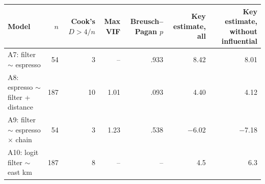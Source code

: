 \begin{tabular}{lrrrrrr}
\toprule
Model & $n$ & Cook's $D > 4/n$ & Max VIF & Breusch--Pagan $p$ & Key estimate, all & Key estimate, without influential \\
\midrule
A7: filter $\sim$ espresso &  54 &  3 & -- & .933 & 8.42 & 8.01 \\
A8: espresso $\sim$ filter + distance & 187 & 10 & 1.01 & .093 & 4.40 & 4.12 \\
A9: filter $\sim$ espresso $\times$ chain &  54 &  3 & 1.23 & .538 & \ensuremath{-}6.02 & \ensuremath{-}7.18 \\
A10: logit filter $\sim$ east km & 187 &  8 & -- & -- & 4.5 & 6.3 \\
\bottomrule
\end{tabular}
